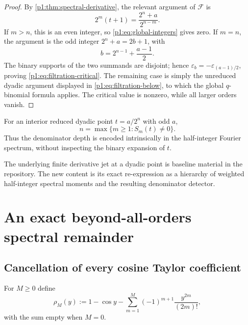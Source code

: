 \documentclass[11pt,oneside]{article}
\theoremstyle{definition}
\theoremstyle{remark}
\newcommand{\eps}{\varepsilon}
\newcommand{\GF}{\mathcal F}
\begin{document}
\begin{proof}
By \cref{p1:thm:spectral-derivative}, the relevant argument of $\GF$ is
\[
 2^m(t+1)=\frac{2^n+a}{2^{n-m}}.
\]
If $m>n$, this is an even integer, so \eqref{p1:eq:global-integers} gives zero.
If $m=n$, the argument is the odd integer $2^n+a=2b+1$, with
\[
 b=2^{n-1}+\frac{a-1}{2}.
\]
The binary supports of the two summands are disjoint; hence
$\eps_b=-\eps_{(a-1)/2}$, proving \eqref{p1:eq:filtration-critical}.  The remaining
case is simply the unreduced dyadic argument displayed in
\eqref{p1:eq:filtration-below}, to which the global $q$-binomial formula applies.
The critical value is nonzero, while all larger orders vanish.
\end{proof}

\begin{corollary}\label{p1:cor:denominator-detection}
For an interior reduced dyadic point $t=a/2^n$ with odd $a$,
\begin{equation}\label{p1:eq:denominator-detection}
 n=\max\{m\ge1:S_m(t)\ne0\}.
\end{equation}
Thus the denominator depth is encoded intrinsically in the half-integer
Fourier spectrum, without inspecting the binary expansion of $t$.
\end{corollary}

\begin{remark}
The underlying finite derivative jet at a dyadic point is baseline material in
the repository.  The new content is its exact re-expression as a hierarchy of
weighted half-integer spectral moments and the resulting denominator detector.
\end{remark}

\section{An exact beyond-all-orders spectral remainder}\label{p1:sec:beyond-all-orders}

\subsection{Cancellation of every cosine Taylor coefficient}

For $M\ge0$ define
\begin{equation}\label{p1:eq:rho-M}
 \rho_M(y):=1-\cos y-
 \sum_{m=1}^{M}(-1)^{m+1}\frac{y^{2m}}{(2m)!},
\end{equation}
with the sum empty when $M=0$.
\end{document}
